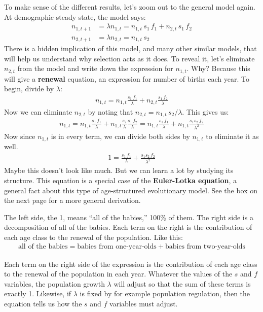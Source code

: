 \documentclass[10pt,reqno]{amsbook}
\newcommand{\bemph}[1]{{\textbf{\textcolor{bemphcol}{#1}}}}
\numberwithin{equation}{chapter}
\begin{document}
To make sense of the different results, let's zoom out to the general model again. At demographic steady state, the model says:
\begin{align*}
	n_{1,t+1} &= \lambda n_{1,t} = n_{1,t} \, s_1 \, f_1   + n_{2,t} \, s_1 \, f_2 \\
	n_{2,t+1} &= \lambda n_{2,t} = n_{1,t} \, s_2 
\end{align*}
There is a hidden implication of this model, and many other similar models, that will help us understand why selection acts as it does. To reveal it, let's eliminate $n_{2,t}$ from the model and write down the expression for $n_{1,t}$. Why? Because this will give a \bemph{renewal} equation, an expression for number of births each year. To begin, divide by $\lambda$:
\begin{align*}
	n_{1,t} = n_{1,t} \frac{ s_1 \, f_1}{\lambda}   +  n_{2,t} \frac{ s_1 \, f_2}{\lambda}
\end{align*}
Now we can eliminate $n_{2,t}$ by noting that $n_{2,t}=n_{1,t} \, s_2 / \lambda$. This gives us:
\begin{align*}
	n_{1,t} = n_{1,t} \frac{ s_1 \, f_1}{\lambda}   +  n_{1,t} \frac{s_2}{\lambda} \frac{ s_1 \, f_2}{\lambda} = n_{1,t} \frac{ s_1 \, f_1}{\lambda}   +  n_{1,t} \frac{ s_1  s_2 \, f_2}{\lambda^2}
\end{align*}
Now since $n_{1,t}$ is in every term, we can divide both sides by $n_{1,t}$ to eliminate it as well. 
\begin{align*}
	1 = \frac{ s_1 \, f_1}{\lambda} +  \frac{ s_1  s_2 \, f_2}{\lambda^2}
\end{align*}
Maybe this doesn't look like much. But we can learn a lot by studying its structure. This equation is a special case of the \bemph{Euler-Lotka equation}, a general fact about this type of age-structured evolutionary model. See the box on the next page for a more general derivation. 

The left side, the 1, means ``all of the babies,'' 100\% of them. The right side is a decomposition of all of the babies. Each term on the right is the contribution of each age class to the renewal of the population. Like this:
\begin{align*}
	\text{all of the babies} = \text{babies from one-year-olds} + \text{babies from two-year-olds}
\end{align*}

Each term on the right side of the expression is the contribution of each age class to the renewal of the population in each year. Whatever the values of the $s$ and $f$ variables, the population growth $\lambda$ will adjust so that the sum of these terms is exactly 1. Likewise, if $\lambda$ is fixed by for example population regulation, then the equation tells us how the $s$ and $f$ variables must adjust. 
\end{document}

